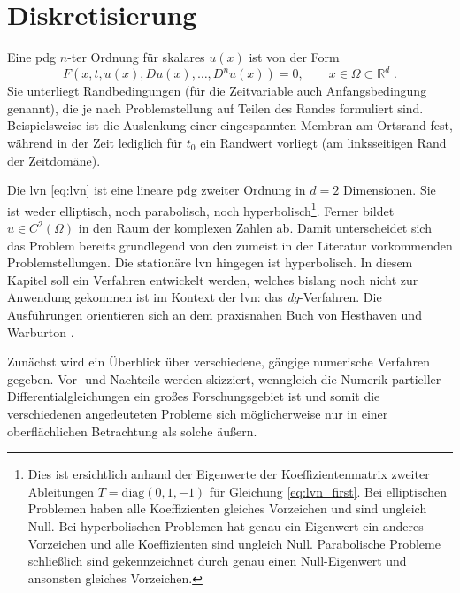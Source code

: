 \chapter{Diskretisierung}

Eine \ac{pdg} $n$-ter Ordnung für skalares $u(x)$ ist von der Form
\begin{equation}
  F(x, t, u(x), Du(x), \dots, D^nu(x))=0, \qquad x\in\Omega\subset\mathbb{R}^d \; .
\end{equation}
Sie unterliegt Randbedingungen (für die Zeitvariable auch Anfangsbedingung genannt), die je nach Problemstellung auf Teilen des Randes formuliert sind. Beispielsweise ist die Auslenkung einer eingespannten Membran am Ortsrand fest, während in der Zeit lediglich für $t_0$ ein Randwert vorliegt (am linksseitigen Rand der Zeitdomäne).

Die \ac{lvn} \eqref{eq:lvn} ist eine lineare \ac{pdg} zweiter Ordnung in $d=2$ Dimensionen. Sie ist weder elliptisch, noch parabolisch, noch hyperbolisch\footnote{Dies ist ersichtlich anhand der Eigenwerte der Koeffizientenmatrix zweiter Ableitungen $T=\text{diag}(0,1,-1)$ für Gleichung \eqref{eq:lvn_first}. Bei elliptischen Problemen haben alle Koeffizienten gleiches Vorzeichen und sind ungleich Null. Bei hyperbolischen Problemen hat genau ein Eigenwert ein anderes Vorzeichen und alle Koeffizienten sind ungleich Null. Parabolische Probleme schließlich sind gekennzeichnet durch genau einen Null-Eigenwert und ansonsten gleiches Vorzeichen.}.
Ferner bildet $u\in C^2(\Omega)$ in den Raum der komplexen Zahlen ab. Damit unterscheidet sich das Problem bereits grundlegend von den zumeist in der Literatur vorkommenden Problemstellungen. Die stationäre \ac{lvn} hingegen ist hyperbolisch. In diesem Kapitel soll ein Verfahren entwickelt werden, welches bislang noch nicht zur Anwendung gekommen ist im Kontext der \ac{lvn}: das \emph{\ac{dg}}-Verfahren. Die Ausführungen orientieren sich an dem praxisnahen Buch von Hesthaven und Warburton \cite{buch}.

Zunächst wird ein Überblick über verschiedene, gängige numerische Verfahren gegeben. Vor- und Nachteile werden skizziert, wenngleich die Numerik partieller Differentialgleichungen ein großes Forschungsgebiet ist und somit die verschiedenen angedeuteten Probleme sich möglicherweise nur in einer oberflächlichen Betrachtung als solche äußern.

